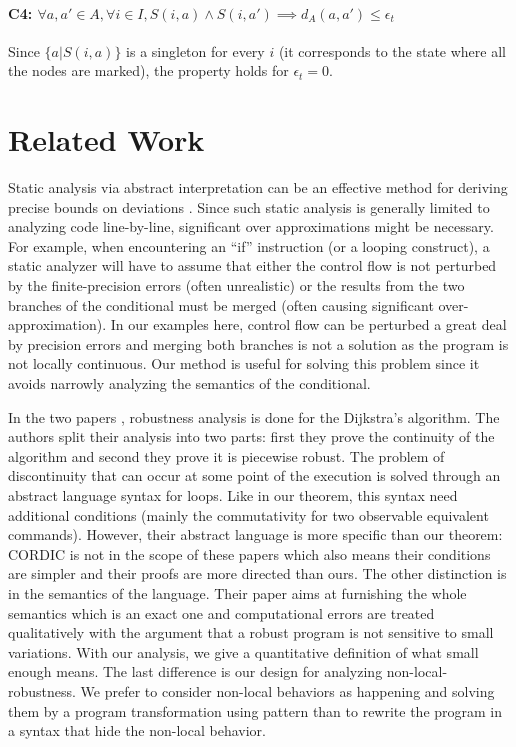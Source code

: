 \documentclass[copyright,creativecommons]{eptcs}
\newcommand{\Cfour}{C4}
\newcommand{\AND}{\mathrel{\wedge}}
\begin{document}
\paragraph{\Cfour: $\forall a,a' \in A,\forall i \in I, S(i,a) \AND S(i,a') \implies d_A(a,a') \leq \epsilon_t$}
Since $\{ a | S(i,a)\}$ is a singleton for every $i$ (it corresponds to the state where all the nodes are marked), the property
holds for $\epsilon_t=0$.

\section{Related Work}\label{sec:related}



Static analysis via abstract interpretation can be an effective method
for deriving precise bounds on deviations
\cite{goubault01sas,goubault11vmcai}.  Since such static analysis is
generally limited to analyzing code line-by-line, significant over
approximations might be necessary.  For example, when encountering an
``if'' instruction (or a looping construct), a static analyzer will
have to assume that either the control flow is not perturbed by the
finite-precision errors (often unrealistic) or the results from the
two branches of the conditional must be merged (often causing
significant over-approximation).  In our examples here, control flow
can be perturbed a great deal by precision errors and merging both
branches is not a solution as the program is not locally continuous.
Our method is useful for solving this problem since it avoids narrowly
analyzing the semantics of the conditional.



In the two papers \cite{chaudhuri11sigsoft,chaudhuri10popl},
robustness analysis is done for the Dijkstra's algorithm. The authors
split their analysis into two parts: first they prove the continuity
of the algorithm and second they prove it is piecewise robust. The
problem of discontinuity that can occur at some point of the execution
is solved through an abstract language syntax for loops.  Like in our
theorem, this syntax need additional conditions (mainly the
commutativity for two observable equivalent commands).  However, their
abstract language is more specific than our theorem: CORDIC is not in
the scope of these papers which also means their conditions are
simpler and their proofs are more directed than ours.  The other
distinction is in the semantics of the language. Their paper aims at
furnishing the whole semantics which is an exact one and computational
errors are treated qualitatively with the argument that a robust
program is not sensitive to small variations. With our analysis, we
give a quantitative definition of what small enough means.  The last
difference is our design for analyzing non-local-robustness.  We prefer
to consider non-local behaviors as happening and solving them by a program
transformation using pattern than to rewrite the program in a syntax
that hide the non-local behavior.
\end{document}
